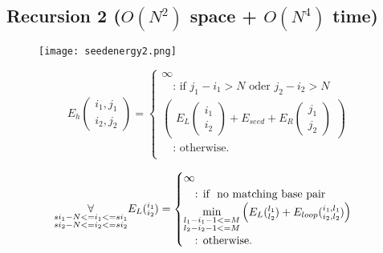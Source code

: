 \subsection{Recursion 2 ($O(N^{2})$ space + $O(N^{4})$ time)}

\begin{figure}[H]
	\centering
	\texttt{[image: seedenergy2.png]}
\end{figure}

\begin{equation*}
E_h(\substack{i_1,j_1\\i_2,j_2}) = \begin{cases}
\infty\\
\quad\text{: if } j_{1} - i_{1} > N \text{ oder } j_{2} - i_{2} > N\\
\begin{pmatrix}
E_{L}(\substack{i_1\\i_2}) + E_{seed} + E_{R}(\substack{j_1\\j_2})
\end{pmatrix}\\
\quad\text{: otherwise.}\\
\end{cases}
\end{equation*}

\begin{equation*}
\underset{\substack{si_{1}-N <= i_{1} <= si_{1}\\si_{2}-N <= i_{2} <= si_{2}}}{\forall}\\
E_L(\substack{i_1\\i_2}) = \begin{cases}
\infty\\
\quad\text{: if } \text{ no matching base pair }\\
\min\limits_{\substack{l_{1} - i_{1} - 1 <= M\\l_{2} - i_{2} - 1 <= M}}
\begin{pmatrix}
E_L(\substack{l_1\\l_2}) + E_{loop}(\substack{i_1,l_1\\i_2,l_2})
\end{pmatrix}\\
\quad\text{: otherwise.}\\

\end{cases}
\end{equation*}

